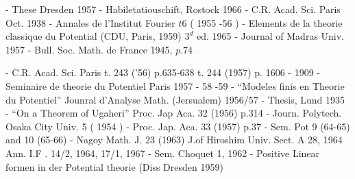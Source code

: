 \begin{thebibliography}{99}
\pageoriginale- These Dresden 1957
- Habiletatiouschift, Rostock 1966
- C.R. Acad. Sci. Paris  Oct. 1938
- Annales de l'Institut Fourier $t6$ ( 1955 -56 ) 
 - Elements de la theorie classique du Potential
  (CDU, Paris, 1959) $3^d$ ed. 1965 
 - Journal of Madras  Univ. 1957
 - Bull. Soc. Math. de France 1945, $p. 74 $

 - C.R. Acad. Sci. Paris t. 243 ('56)
  p.635-638   t. 244 (1957) p.  1606 - 1909  
 - Seminaire de theorie du Potentiel Paris
  1957 - 58 -59  
 - ``Modeles finis en Theorie du
  Potentiel'' Jounral d'Analyse Math. (Jersualem) 1956/57 
 - Thesis, Lund 1935
 - ``On a Theorem of Ugaheri'' Proc. Jap
  Aca. 32 (1956)  p.314  
 - Journ. Polytech. Osaka City Univ. 5 ( 1954 ) 
 - Proc. Jap. Aca. 33  (1957)  p.37
 - Sem. Pot   9 (64-65)  and  10 (65-66) 
 - Nagoy Math. J. 23 (1963) J.of Hiroshim
  Univ. Sect. A 28, 1964 Ann.  I.F . 14/2, 1964, 17/1, 1967 
 - Sem. Choquet 1, 1962
 - Positive Linear formen in der Potential
  theorie (Diss Dresden 1959)   
\end{thebibliography}
